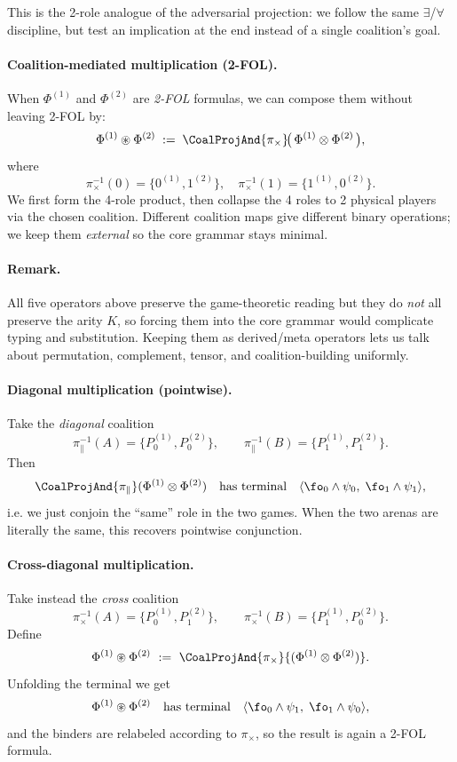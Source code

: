 This is the 2-role analogue of the adversarial projection: we follow the
same $\exists$/$\forall$ discipline, but test an implication at the end
instead of a single coalition’s goal.

\paragraph{Coalition-mediated multiplication (2-FOL).}
When $\Phi^{(1)}$ and $\Phi^{(2)}$ are \emph{2-FOL} formulas, we can
compose them without leaving 2-FOL by:
\[
\Phi^{(1)} \mathbin{\circledast} \Phi^{(2)}
\;:=\;
\CoalProjAnd{\pi_{\times}}\!\bigl(\,\Phi^{(1)} \otimes \Phi^{(2)}\,\bigr),
\]
where
\[
\pi_{\times}^{-1}(0) = \{ 0^{(1)}, 1^{(2)} \}, \quad
\pi_{\times}^{-1}(1) = \{ 1^{(1)}, 0^{(2)} \}.
\]
We first form the 4-role product,
then collapse the 4 roles to 2 physical players via the chosen
coalition. Different coalition maps give different binary operations;
we keep them \emph{external} so the core grammar stays minimal.

\paragraph{Remark.}
All five operators above preserve the game-theoretic reading but they
do \emph{not} all preserve the arity $K$, so forcing them into the
core grammar would complicate typing and substitution. Keeping them as
derived/meta operators lets us talk about permutation, complement,
tensor, and coalition-building uniformly.

\paragraph{Diagonal multiplication (pointwise).}
Take the \emph{diagonal} coalition
\[
\pi_{\parallel}^{-1}(A) = \{ P_0^{(1)}, P_0^{(2)} \},
\qquad
\pi_{\parallel}^{-1}(B) = \{ P_1^{(1)}, P_1^{(2)} \}.
\]
Then
\[
\CoalProjAnd{\pi_{\parallel}}(\Phi^{(1)} \otimes \Phi^{(2)})
\quad\text{has terminal}\quad
\langle \fo_0 \wedge \psi_0, \; \fo_1 \wedge \psi_1 \rangle,
\]
i.e. we just conjoin the ``same'' role in the two games. When the two arenas
are literally the same, this recovers pointwise conjunction.

\paragraph{Cross-diagonal multiplication.}
Take instead the \emph{cross} coalition
\[
\pi_{\times}^{-1}(A) = \{ P_0^{(1)}, P_1^{(2)} \},
\qquad
\pi_{\times}^{-1}(B) = \{ P_1^{(1)}, P_0^{(2)} \}.
\]
Define
\[
\Phi^{(1)} \circledast \Phi^{(2)} \ :=\
\CoalProjAnd{\pi_{\times}}{(\Phi^{(1)} \otimes \Phi^{(2)})}.
\]
Unfolding the terminal we get
\[
\Phi^{(1)} \circledast \Phi^{(2)}
\quad\text{has terminal}\quad
\langle \fo_0 \wedge \psi_1,\; \fo_1 \wedge \psi_0 \rangle,
\]
and the binders are relabeled according to $\pi_{\times}$, so the result is again
a 2-FOL formula.

